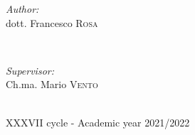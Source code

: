 \begin{titlepage}
\begin{minipage}{0.4\textwidth}
\begin{flushleft} \large
\emph{Author:} \\
dott. Francesco \textsc{Rosa} \newline
\end{flushleft}
\end{minipage}
~
\begin{minipage}{0.37\textwidth}
\begin{flushright} \large
\emph{Supervisor:}\\
Ch.ma. Mario \textsc{Vento}\newline
\end{flushright}
\end{minipage}\\[1.5cm]



{\large XXXVII cycle - Academic year 2021/2022}\\[1cm] %

 

\vfill %
\end{titlepage}